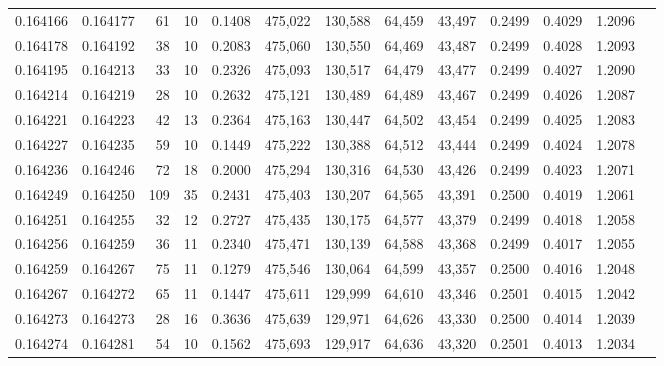 \begin{tabular}{rrrrrrrrrrrrr}
0.164166 & 0.164177 &    61 &  10 &                                     0.1408 & 475,022 & 130,588 &  64,459 &  43,497 & 0.2499 & 0.4029 & 1.2096 \\
0.164178 & 0.164192 &    38 &  10 &                                     0.2083 & 475,060 & 130,550 &  64,469 &  43,487 & 0.2499 & 0.4028 & 1.2093 \\
0.164195 & 0.164213 &    33 &  10 &                                     0.2326 & 475,093 & 130,517 &  64,479 &  43,477 & 0.2499 & 0.4027 & 1.2090 \\
0.164214 & 0.164219 &    28 &  10 &                                     0.2632 & 475,121 & 130,489 &  64,489 &  43,467 & 0.2499 & 0.4026 & 1.2087 \\
0.164221 & 0.164223 &    42 &  13 &                                     0.2364 & 475,163 & 130,447 &  64,502 &  43,454 & 0.2499 & 0.4025 & 1.2083 \\
0.164227 & 0.164235 &    59 &  10 &                                     0.1449 & 475,222 & 130,388 &  64,512 &  43,444 & 0.2499 & 0.4024 & 1.2078 \\
0.164236 & 0.164246 &    72 &  18 &                                     0.2000 & 475,294 & 130,316 &  64,530 &  43,426 & 0.2499 & 0.4023 & 1.2071 \\
0.164249 & 0.164250 &   109 &  35 &                                     0.2431 & 475,403 & 130,207 &  64,565 &  43,391 & 0.2500 & 0.4019 & 1.2061 \\
0.164251 & 0.164255 &    32 &  12 &                                     0.2727 & 475,435 & 130,175 &  64,577 &  43,379 & 0.2499 & 0.4018 & 1.2058 \\
0.164256 & 0.164259 &    36 &  11 &                                     0.2340 & 475,471 & 130,139 &  64,588 &  43,368 & 0.2499 & 0.4017 & 1.2055 \\
0.164259 & 0.164267 &    75 &  11 &                                     0.1279 & 475,546 & 130,064 &  64,599 &  43,357 & 0.2500 & 0.4016 & 1.2048 \\
0.164267 & 0.164272 &    65 &  11 &                                     0.1447 & 475,611 & 129,999 &  64,610 &  43,346 & 0.2501 & 0.4015 & 1.2042 \\
0.164273 & 0.164273 &    28 &  16 &                                     0.3636 & 475,639 & 129,971 &  64,626 &  43,330 & 0.2500 & 0.4014 & 1.2039 \\
0.164274 & 0.164281 &    54 &  10 &                                     0.1562 & 475,693 & 129,917 &  64,636 &  43,320 & 0.2501 & 0.4013 & 1.2034 \\

\end{tabular}
